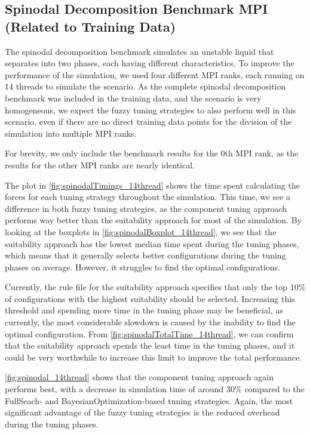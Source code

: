 \subsection{Spinodal Decomposition Benchmark MPI (Related to Training Data)}

The spinodal decomposition benchmark simulates an unstable liquid that separates into two phases, each having different characteristics. To improve the performance of the simulation, we used four different MPI ranks, each running on 14 threads to simulate the scenario. As the complete spinodal decomposition benchmark was included in the training data, and the scenario is very homogeneous, we expect the fuzzy tuning strategies to also perform well in this scenario, even if there are no direct training data points for the division of the simulation into multiple MPI ranks.

For brevity, we only include the benchmark results for the 0th MPI rank, as the results for the other MPI ranks are nearly identical.

The plot in \autoref{fig:spinodalTimings_14thread} shows the time spent calculating the forces for each tuning strategy throughout the simulation. This time, we see a difference in both fuzzy tuning strategies, as the component tuning approach performs way better than the suitability approach for most of the simulation. By looking at the boxplots in \autoref{fig:spinodalBoxplot_14thread}, we see that the suitability approach has the lowest median time spent during the tuning phases, which means that it generally selects better configurations during the tuning phases on average. However, it struggles to find the optimal configurations.

Currently, the rule file for the suitability approach specifies that only the top 10\% of configurations with the highest suitability should be selected. Increasing this threshold and spending more time in the tuning phase may be beneficial, as currently, the most considerable slowdown is caused by the inability to find the optimal configuration. From \autoref{fig:spinodalTotalTime_14thread}, we can confirm that the suitability approach spends the least time in the tuning phases, and it could be very worthwhile to increase this limit to improve the total performance.

\autoref{fig:spinodal_14thread} shows that the component tuning approach again performs best, with a decrease in simulation time of around 30\% compared to the FullSeach- and BayesianOptimization-based tuning strategies. Again, the most significant advantage of the fuzzy tuning strategies is the reduced overhead during the tuning phases.



